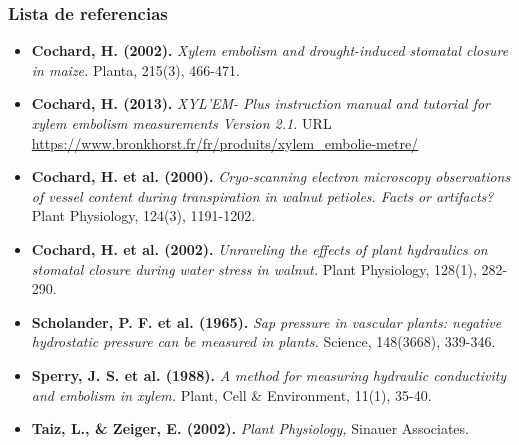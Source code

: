 \documentclass[usepdftitle=false]{beamer}
\newenvironment{changemargin}[2]{%
\begin{list}{}{%
\setlength{\topsep}{0pt}%
\setlength{\leftmargin}{#1}%
\setlength{\rightmargin}{#2}%
\setlength{\listparindent}{\parindent}%
\setlength{\itemindent}{\parindent}%
\setlength{\parsep}{\parskip}%
}%
\item[]}{\end{list}}
\begin{document}
\begin{frame}%
\frametitle{Lista de referencias}\label{bib}
\color{black}
\begin{changemargin}{-1.5em}{-1.5em}
 {\footnotesize \justifying
\begin{itemize}
 
 \item \textbf{Cochard, H. (2002).} \textit{Xylem embolism and drought-induced stomatal closure in maize.} Planta, 215(3), 466-471.
 \item  \textbf{Cochard, H. (2013).} \textit{XYL’EM- Plus instruction manual and tutorial for xylem embolism measurements Version 2.1.} URL \url{https://www.bronkhorst.fr/fr/produits/xylem_embolie-metre/}
 \item \textbf{ Cochard, H. et al. (2000).} \textit{Cryo-scanning electron microscopy observations of vessel content during transpiration in walnut petioles. Facts or artifacts?} Plant Physiology, 124(3), 1191-1202.
 \item\textbf{ Cochard, H. et al. (2002).} \textit{Unraveling the effects of plant hydraulics on stomatal closure during water stress in walnut.} Plant Physiology, 128(1), 282-290. 
 \item \textbf{ Scholander, P. F. et al. (1965).} \textit{Sap pressure in vascular plants: negative hydrostatic pressure can be measured in plants.} Science, 148(3668), 339-346.
 \item \textbf{ Sperry, J. S. et al. (1988).} \textit{A method for measuring hydraulic conductivity and embolism in xylem.} Plant, Cell \& Environment, 11(1), 35-40.
 \item \textbf{Taiz, L., \& Zeiger, E. (2002).} \textit{Plant Physiology,} Sinauer Associates.
\end{itemize}
} 
\end{changemargin}
\end{frame}
\end{document}
